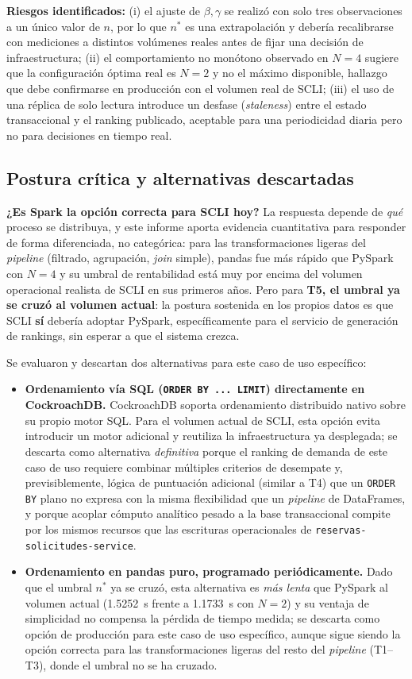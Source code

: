 \documentclass[10pt,conference]{IEEEtran}
\begin{document}
\textbf{Riesgos identificados:} (i) el ajuste de $\beta,\gamma$ se realizó con solo tres observaciones a un único valor de $n$, por lo que $n^{*}$ es una extrapolación y debería recalibrarse con mediciones a distintos volúmenes reales antes de fijar una decisión de infraestructura; (ii) el comportamiento no monótono observado en $N=4$ sugiere que la configuración óptima real es $N=2$ y no el máximo disponible, hallazgo que debe confirmarse en producción con el volumen real de SCLI; (iii) el uso de una réplica de solo lectura introduce un desfase (\textit{staleness}) entre el estado transaccional y el ranking publicado, aceptable para una periodicidad diaria pero no para decisiones en tiempo real.

\subsection{Postura crítica y alternativas descartadas}

\textbf{¿Es Spark la opción correcta para SCLI hoy?} La respuesta depende de \emph{qué} proceso se distribuya, y este informe aporta evidencia cuantitativa para responder de forma diferenciada, no categórica: para las transformaciones ligeras del \textit{pipeline} (filtrado, agrupación, \textit{join} simple), pandas fue más rápido que PySpark con $N=4$ y su umbral de rentabilidad está muy por encima del volumen operacional realista de SCLI en sus primeros años. Pero para \textbf{T5, el umbral ya se cruzó al volumen actual}: la postura sostenida en los propios datos es que SCLI \textbf{sí} debería adoptar PySpark, específicamente para el servicio de generación de rankings, sin esperar a que el sistema crezca.

Se evaluaron y descartan dos alternativas para este caso de uso específico:
\begin{itemize}
  \item \textbf{Ordenamiento vía SQL (\texttt{ORDER BY ... LIMIT}) directamente en CockroachDB.} CockroachDB soporta ordenamiento distribuido nativo sobre su propio motor SQL. Para el volumen actual de SCLI, esta opción evita introducir un motor adicional y reutiliza la infraestructura ya desplegada; se descarta como alternativa \emph{definitiva} porque el ranking de demanda de este caso de uso requiere combinar múltiples criterios de desempate y, previsiblemente, lógica de puntuación adicional (similar a T4) que un \texttt{ORDER BY} plano no expresa con la misma flexibilidad que un \textit{pipeline} de DataFrames, y porque acoplar cómputo analítico pesado a la base transaccional compite por los mismos recursos que las escrituras operacionales de \texttt{reservas-solicitudes-service}.
  \item \textbf{Ordenamiento en pandas puro, programado periódicamente.} Dado que el umbral $n^{*}$ ya se cruzó, esta alternativa es \emph{más lenta} que PySpark al volumen actual (\SI{1.5252}{\second} frente a \SI{1.1733}{\second} con $N=2$) y su ventaja de simplicidad no compensa la pérdida de tiempo medida; se descarta como opción de producción para este caso de uso específico, aunque sigue siendo la opción correcta para las transformaciones ligeras del resto del \textit{pipeline} (T1--T3), donde el umbral no se ha cruzado.
\end{itemize}
\end{document}
